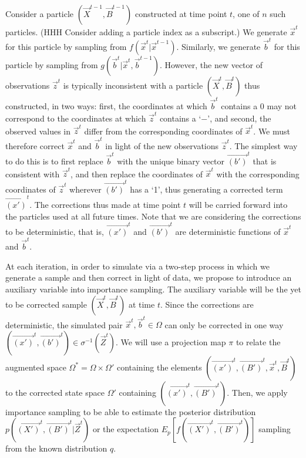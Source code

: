 Consider a particle $(\vec{X}^{t-1},\vec{B}^{t-1})$ constructed at time point $t$, one of $n$ such particles. {\color{red} (HHH Consider adding a particle index as a subscript.)} We generate $\vec{x}^t$ for this particle by sampling from $f(\vec{x}^t | \vec{x}^{t-1})$. Similarly, we generate $\vec{b}^{t}$ for this particle by sampling from $g(\vec{b}^{t} | \vec{x}^t, \vec{b}^{t-1})$. However, the new vector of observations $\vec{z}^{t}$ is typically inconsistent with a particle $(\vec{X}^{t}, \vec{B}^{t})$ thus constructed, in two ways: first, the coordinates at which $\vec{b}^{t}$ contains a 0 may not correspond to the coordinates at which $\vec{z}^{t}$ contains a `$-$', and second, the observed values in $\vec{z}^{t}$ differ from the corresponding coordinates of $\vec{x}^{t}$. We must therefore correct $\vec{x}^{t}$ and $\vec{b}^{t}$ in light of the new observations $\vec{z}^{t}$. The simplest way to do this is to first replace $\vec{b}^{t}$ with the unique binary vector $\vec{(b')}^{t}$ that is consistent with $\vec{z}^{t}$, and then replace the coordinates of $\vec{x}^{t}$ with the corresponding coordinates of $\vec{z}^{t}$ wherever $\vec{(b')}^{t}$ has a `1', thus generating a corrected term $\vec{(x')}^{t}$. The corrections thus made at time point $t$ will be carried forward into the particles used at all future times. Note that we are considering the corrections to be deterministic, that is, $\vec{(x')}^{t}$ and $\vec{(b')}^{t}$ are deterministic functions of $\vec{x}^{t}$ and $\vec{b}^{t}$.

At each iteration, in order to simulate via a two-step process in which we generate a sample and then correct in light of data, we propose to introduce an auxiliary variable into importance sampling. The auxiliary variable will be the yet to be corrected sample $(\vec{X}^{t}, \vec{B}^{t})$ at time $t$. Since the corrections are deterministic, the simulated pair $\vec{x}^t, \vec{b}^t \in \Omega$ can only be corrected in one way $(\vec{(x')}^t, \vec{(b')}^t) \in \sigma^{-1}(\vec{Z}^t)$. We will use a projection map $\pi$ to relate the augmented space $\Omega^{*} = \Omega \times \Omega'$ containing the elements $(\vec{(x')}^{t}, \vec{(B')}^{t}, \vec{x}^{t}, \vec{B}^{t})$ to the corrected state space $\Omega'$ containing $(\vec{(x')}^{t}, \vec{(B')}^{t})$. Then, we apply importance sampling to be able to estimate the posterior distribution $p(\vec{(X')}^{t}, \vec{(B')}^{t} | \vec{Z}^{t})$ or the expectation $E_{p}[f(\vec{(X')}^{t},\vec{(B')}^{t})]$ sampling from the known distribution $q$.

